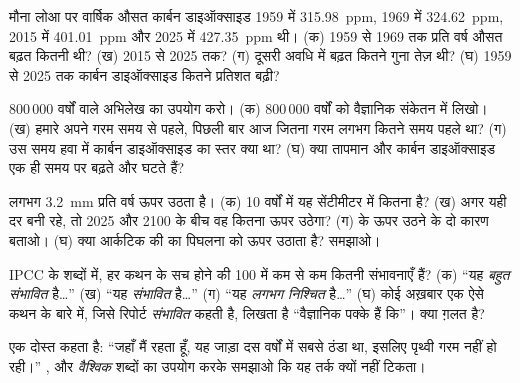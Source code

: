 \begin{exercise}[$\star\star$]\label{exo:g9:climate-past-and-present:6}
मौना लोआ पर वार्षिक औसत कार्बन डाइऑक्साइड 1959 में \qty{315.98}{ppm}, 1969 में
\qty{324.62}{ppm}, 2015 में \qty{401.01}{ppm} और 2025 में \qty{427.35}{ppm} थी।
(क) 1959 से 1969 तक प्रति वर्ष औसत बढ़त कितनी थी? (ख) 2015 से 2025 तक? (ग) दूसरी
अवधि में बढ़त कितने गुना तेज़ थी? (घ) 1959 से 2025 तक कार्बन डाइऑक्साइड कितने प्रतिशत
बढ़ी?
\end{exercise}

\begin{exercise}[$\star\star$]\label{exo:g9:climate-past-and-present:7}
800\,000 वर्षों वाले अभिलेख का उपयोग करो। (क) 800\,000 वर्षों को वैज्ञानिक संकेतन में
लिखो। (ख) हमारे अपने गरम समय से पहले, पिछली बार आज जितना गरम लगभग कितने समय पहले था?
(ग) उस समय हवा में कार्बन डाइऑक्साइड का स्तर क्या था? (घ) क्या तापमान और कार्बन
डाइऑक्साइड एक ही समय पर बढ़ते और घटते
हैं?
\end{exercise}

\begin{exercise}[$\star\star$]\label{exo:g9:climate-past-and-present:8}
 लगभग \qty{3.2}{mm} प्रति वर्ष ऊपर उठता है। (क) 10 वर्षों में यह सेंटीमीटर में
कितना है? (ख) अगर यही दर बनी रहे, तो 2025 और 2100 के बीच वह कितना ऊपर उठेगा? (ग) 
के ऊपर उठने के दो कारण बताओ। (घ) क्या आर्कटिक की  का पिघलना  को ऊपर
उठाता है? समझाओ।
\end{exercise}

\begin{exercise}[$\star\star$]\label{exo:g9:climate-past-and-present:9}
IPCC के शब्दों में, हर कथन के सच होने की 100 में कम से कम कितनी संभावनाएँ हैं? (क) ``यह
\emph{बहुत संभावित} है\ldots'' (ख) ``यह \emph{संभावित} है\ldots'' (ग) ``यह \emph{लगभग
निश्चित} है\ldots'' (घ) कोई अख़बार एक ऐसे कथन के बारे में, जिसे रिपोर्ट \emph{संभावित}
कहती है, लिखता है ``वैज्ञानिक पक्के हैं कि''। क्या ग़लत
है?
\end{exercise}

\begin{exercise}[$\star\star$]\label{exo:g9:climate-past-and-present:10}
एक दोस्त कहता है: ``जहाँ मैं रहता हूँ, यह जाड़ा दस वर्षों में सबसे ठंडा था, इसलिए पृथ्वी गरम
नहीं हो रही।'' \emph{}, \emph{} और \emph{वैश्विक} शब्दों का उपयोग करके
समझाओ कि यह तर्क क्यों नहीं टिकता।
\end{exercise}

